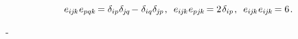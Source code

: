 \nopagebreak\vspace{-0.3em}\begin{equation}\label{veblencontraction}
e_{i\hspace{-0.1ex}j\hspace{-0.1ex}k} \hspace{.1ex} e_{pqk} \hspace{-0.25ex} = \delta_{ip} \delta_{\hspace{-0.1ex}j\hspace{-0.1ex}q} \hspace{-0.25ex} - \hspace{.1ex} \delta_{iq} \delta_{\hspace{-0.1ex}j\hspace{-0.1ex}p}
\hspace{.2ex} ,
\hspace{.5em}
%
e_{i\hspace{-0.1ex}j\hspace{-0.1ex}k} \hspace{.1ex} e_{pj\hspace{-0.1ex}k} \hspace{-0.25ex} = 2 \hspace{.2ex} \delta_{ip}
\hspace{.2ex} ,
\hspace{.5em}
%
e_{i\hspace{-0.1ex}j\hspace{-0.1ex}k} \hspace{.1ex} e_{i\hspace{-0.1ex}j\hspace{-0.1ex}k} \hspace{-0.25ex} = 6
\hspace{.2ex} .
\end{equation}

\crossproductinquotes\hbox{-}

